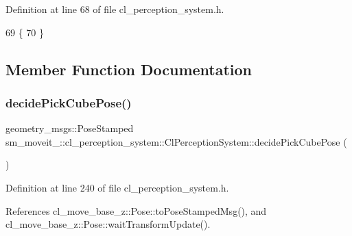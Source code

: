 Definition at line 68 of file cl\+\_\+perception\+\_\+system.\+h.


\begin{DoxyCode}
69   \{
70   \}
\end{DoxyCode}


\subsection{Member Function Documentation}
\mbox{\label{classsm__moveit__3_1_1cl__perception__system_1_1ClPerceptionSystem_accc2813b1da308e9a71bec317db4590d}} 
\subsubsection{\texorpdfstring{decide\+Pick\+Cube\+Pose()}{decidePickCubePose()}}
{\footnotesize\ttfamily geometry\+\_\+msgs\+::\+Pose\+Stamped sm\+\_\+moveit\+\_\+::cl\+\_\+perception\+\_\+system\+::\+Cl\+Perception\+System\+::decide\+Pick\+Cube\+Pose (\begin{DoxyParamCaption}{ }\end{DoxyParamCaption})\hspace{0.3cm}{\ttfamily [inline]}}



Definition at line 240 of file cl\+\_\+perception\+\_\+system.\+h.



References cl\+\_\+move\+\_\+base\+\_\+z\+::\+Pose\+::to\+Pose\+Stamped\+Msg(), and cl\+\_\+move\+\_\+base\+\_\+z\+::\+Pose\+::wait\+Transform\+Update().


